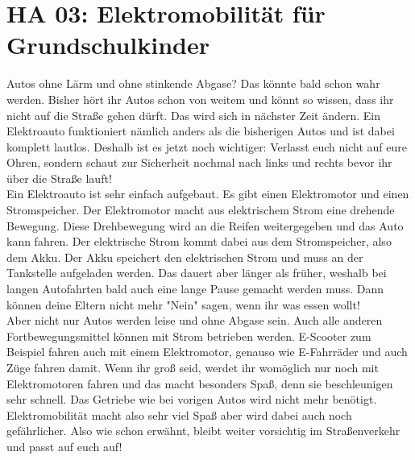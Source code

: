 \chapter{HA 03: Elektromobilität für Grundschulkinder}
Autos ohne Lärm und ohne stinkende Abgase? Das könnte bald schon wahr werden. Bisher hört ihr Autos schon von weitem und könnt so wissen, dass ihr nicht auf die Straße gehen dürft. Das wird sich in nächster Zeit ändern. Ein Elektroauto funktioniert nämlich anders als die bisherigen Autos und ist dabei komplett lautlos. Deshalb ist es jetzt noch wichtiger: Verlasst euch nicht auf eure Ohren, sondern schaut zur Sicherheit nochmal nach links und rechts bevor ihr über die Straße lauft!\\
Ein Elektroauto ist sehr einfach aufgebaut. Es gibt einen Elektromotor und einen Stromspeicher. Der Elektromotor macht aus elektrischem Strom eine drehende Bewegung. Diese Drehbewegung wird an die Reifen weitergegeben und das Auto kann fahren. Der elektrische Strom kommt dabei aus dem Stromspeicher, also dem Akku. Der Akku speichert den elektrischen Strom und muss an der Tankstelle aufgeladen werden. Das dauert aber länger als früher, weshalb bei langen Autofahrten bald auch eine lange Pause gemacht werden muss. Dann können deine Eltern nicht mehr "Nein" sagen, wenn ihr was essen wollt!\\
Aber nicht nur Autos werden leise und ohne Abgase sein. Auch alle anderen Fortbewegungsmittel können mit Strom betrieben werden. E-Scooter zum Beispiel fahren auch mit einem Elektromotor, genauso wie E-Fahrräder und auch Züge fahren damit. Wenn ihr groß seid, werdet ihr womöglich nur noch mit Elektromotoren fahren und das macht besonders Spaß, denn sie beschleunigen sehr schnell. Das Getriebe wie bei vorigen Autos wird nicht mehr benötigt.\\
Elektromobilität macht also sehr viel Spaß aber wird dabei auch noch gefährlicher. Also wie schon erwähnt, bleibt weiter vorsichtig im Straßenverkehr und passt auf euch auf!
